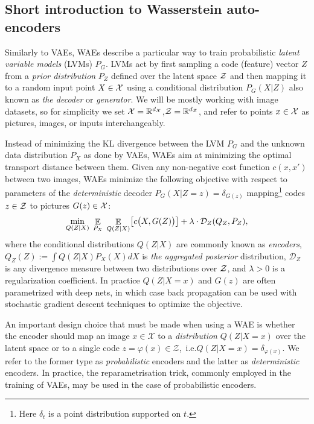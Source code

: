\subsection*{Short introduction to Wasserstein auto-encoders}

Similarly to VAEs, WAEs describe a particular way to train probabilistic \emph{latent variable models} (LVMs) $P_G$.
LVMs act by first sampling a code (feature) vector $Z$ from a \emph{prior distribution} $P_Z$ defined over the latent space $\mathcal{Z}$ and then mapping it to a random input point $X\in\mathcal{X}$ using a conditional distribution $P_G(X|Z)$ also known as \emph{the decoder} or \emph{generator}.
We will be mostly working with image datasets, so for simplicity we set $\mathcal{X}=\mathbb{R}^{d_{\mathcal{X}}}$,\:$\mathcal{Z}=\mathbb{R}^{d_{\mathcal{Z}}}$, and refer to points $x\in\mathcal{X}$ as pictures, images, or inputs interchangeably.

Instead of minimizing the KL divergence between the LVM $P_G$ and the unknown data distribution $P_X$ as done by VAEs, WAEs aim at minimizing the optimal transport distance between them.
Given any non-negative cost function $c(x,x')$ between two images, WAEs minimize the following objective
with respect to parameters of the \emph{deterministic} decoder ${P_G(X|Z=z)}=\delta_{G(z)}$ mapping\footnote{Here $\delta_t$ is a point distribution supported on $t$.} codes $z\in \mathcal{Z}$ to pictures $G(z)\in \mathcal{X}$:
\begin{equation}
\label{eq:WAEobj}
\min_{Q(Z|X)}\; \mathop{\mathbb{E}}\limits_{P_X}\; \mathop{\mathbb{E}}\limits_{Q(Z|X)}\bigl[ c\bigl(X, G(Z)\bigr) \bigr] + \lambda \cdot\mathcal{D}_Z(Q_Z, P_Z),
\end{equation}
where the conditional distributions $Q(Z|X)$ are commonly known as \emph{encoders}, 
$Q_Z(Z):= \int Q(Z|X) P_X(X) dX$ is \emph{the aggregated posterior} distribution,
$\mathcal{D}_Z$ is any divergence measure between two distributions over $\mathcal{Z}$, and
$\lambda>0$ is a regularization coefficient.
In practice $Q(Z|X=x)$ and $G(z)$ are often parametrized with deep nets, in which case back propagation can be used with stochastic gradient descent techniques to optimize the objective.

An important design choice that must be made when using a WAE is whether the encoder should map an image $x\in\mathcal{X}$ to a \emph{distribution} $Q(Z|X=x)$ over the latent space or to a single code $z = \varphi(x)\in\mathcal{Z}$,~i.e.\:$Q(Z|X=x) = \delta_{\varphi(x)}$. We refer to the former type as \emph{probabilistic} encoders and the latter as \emph{deterministic} encoders. In practice, the reparametrisation trick, commonly employed in the training of VAEs, may be used in the case of probabilistic encoders.

